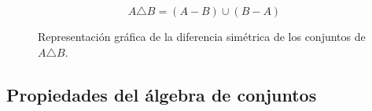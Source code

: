 \begin{equation}
    A \triangle B = (A-B) \cup (B-A)
\end{equation}


\begin{figure}[h]
    \centering
    \caption{Representación gráfica de la diferencia simétrica de los conjuntos de $A \triangle B$.}
    \label{fig:diferenciaSimetricaConjuntos}
\end{figure}

\subsection*{Propiedades del álgebra de conjuntos}

